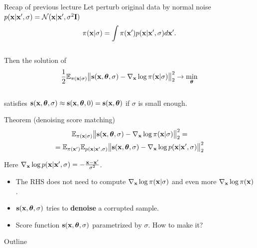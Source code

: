 \begin{frame}{Recap of previous lecture}
	Let perturb original data by normal noise $p(\mathbf{x} | \mathbf{x}', \sigma) = \mathcal{N}(\mathbf{x} | \mathbf{x}', \sigma^2 \mathbf{I})$
	\vspace{-0.3cm}
	\[
	\pi(\mathbf{x} | \sigma) = \int \pi(\mathbf{x}') p(\mathbf{x} | \mathbf{x}', \sigma) d\mathbf{x}'.
	\]
	\vspace{-0.6cm} \\
	Then the solution of 
	\vspace{-0.2cm}
	\[
	\frac{1}{2} \mathbb{E}_{\pi(\mathbf{x} | \sigma)}\bigl\| \mathbf{s}(\mathbf{x}, \boldsymbol{\theta}, \sigma) - \nabla_{\mathbf{x}} \log \pi(\mathbf{x} | \sigma) \bigr\|^2_2 \rightarrow \min_{\boldsymbol{\theta}}
	\]
	\vspace{-0.5cm} \\
	satisfies $\mathbf{s}(\mathbf{x}, \boldsymbol{\theta}, \sigma) \approx \mathbf{s}(\mathbf{x}, \boldsymbol{\theta}, 0) = \mathbf{s}(\mathbf{x}, \boldsymbol{\theta})$ if $\sigma$ is small enough.
	\begin{block}{Theorem (denoising score matching)}
		\vspace{-0.8cm}
		\begin{multline*}
			\mathbb{E}_{\pi(\mathbf{x} | \sigma)}\bigl\| \mathbf{s}(\mathbf{x}, \boldsymbol{\theta}, \sigma) - \nabla_{\mathbf{x}} \log \pi(\mathbf{x} | \sigma) \bigr\|^2_2 = \\ = \mathbb{E}_{\pi(\mathbf{x}')} \mathbb{E}_{p(\mathbf{x} | \mathbf{x}', \sigma)}\bigl\| \mathbf{s}(\mathbf{x}, \boldsymbol{\theta}, \sigma) - \nabla_{\mathbf{x}} \log p(\mathbf{x} | \mathbf{x}', \sigma) \bigr\|^2_2	
		\end{multline*}
		\vspace{-0.8cm}
	\end{block}
	Here $\nabla_{\mathbf{x}} \log p(\mathbf{x} | \mathbf{x}', \sigma) = - \frac{\mathbf{x} - \mathbf{x}'}{\sigma^2}$.
	\begin{itemize}
		\item The RHS does not need to compute $\nabla_{\mathbf{x}} \log \pi(\mathbf{x} | \sigma)$ and even more $\nabla_{\mathbf{x}} \log \pi(\mathbf{x})$.
		\item $\mathbf{s}(\mathbf{x}, \boldsymbol{\theta}, \sigma)$ tries to \textbf{denoise} a corrupted sample.
		\item Score function $\mathbf{s}(\mathbf{x}, \boldsymbol{\theta}, \sigma)$ parametrized by $\sigma$. How to make it?
	\end{itemize}
\end{frame}
\begin{frame}{Outline}
	\tableofcontents
\end{frame}
